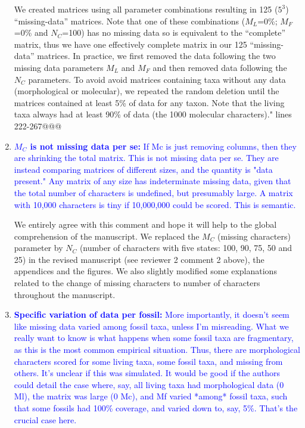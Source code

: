 \documentclass[12pt,letterpaper]{article}
\begin{document}
\begin{enumerate}
We created matrices using all parameter combinations resulting in 125 ($5^3$) “missing-data” matrices. Note that one of these combinations ($M_L$=0\%; $M_F$=0\% and $N_C$=100) has no missing data so is equivalent to the “complete” matrix, thus we have one effectively complete matrix in our 125 “missing-data” matrices. In practice, we first removed the data following the two missing data parameters $M_L$ and $M_F$ and then removed data following the $N_C$ parameters. To avoid avoid matrices containing taxa without any data (morphological or molecular), we repeated the random deletion until the matrices contained at least 5\% of data for any taxon. Note that the living taxa always had at least 90\% of data (the 1000 molecular characters)." lines 222-267@@@

\item{\textcolor{blue}{\textbf{$M_C$ is not missing data per se:} If Mc is just removing columns, then they are shrinking the total matrix. This is not missing data per se. They are instead comparing matrices of different sizes, and the quantity is "data present." Any matrix of any size has indeterminate missing data, given that the total number of characters is undefined, but presumably large. A matrix with 10,000 characters is tiny if 10,000,000 could be scored. This is semantic.}}

We entirely agree with this comment and hope it will help to the global comprehension of the manuscript. We replaced the $M_C$ (missing characters) parameter by $N_C$ (number of characters with five states: 100, 90, 75, 50 and 25) in the revised manuscript (see reviewer 2 comment 2 above), the appendices and the figures. We also slightly modified some explanations related to the change of missing characters to number of characters throughout the manuscript.


\item{\textcolor{blue}{\textbf{Specific variation of data per fossil:} More importantly, it doesn't seem like missing data varied among fossil taxa, unless I'm misreading. What we really want to know is what happens when some fossil taxa are fragmentary, as this is the most common empirical situation. Thus, there are morphological characters scored for some living taxa, some fossil taxa, and missing from others. It's unclear if this was simulated. It would be good if the authors could detail the case where, say, all living taxa had morphological data (0 Ml), the matrix was large (0 Mc), and Mf varied *among* fossil taxa, such that some fossils had 100\% coverage, and varied down to, say, 5\%. That's the crucial case here.}}


\end{enumerate}
\end{document}
